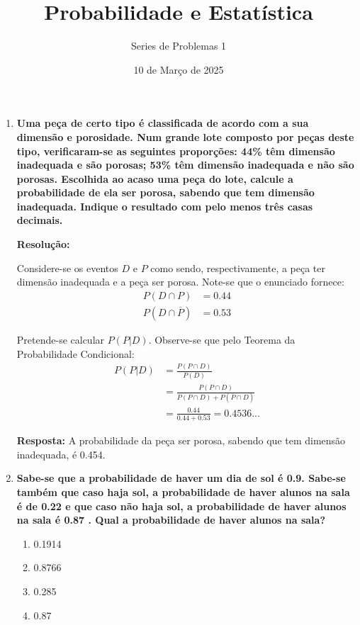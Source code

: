 \documentclass[a4paper,12pt]{article}
\author{Series de Problemas 1}
\begin{document}
\title{Probabilidade e Estatística}
\date{10 de Março de 2025}
\maketitle

\begin{enumerate}
  \item \textbf{Uma peça de certo tipo é classificada de acordo com a sua dimensão e porosidade. Num grande lote composto por peças deste tipo, verificaram-se as seguintes proporções: 44\% têm dimensão inadequada e são porosas; 53\% têm dimensão inadequada e não são porosas.
  Escolhida ao acaso uma peça do lote, calcule a probabilidade de ela ser porosa, sabendo que tem dimensão inadequada.
  Indique o resultado com pelo menos três casas decimais.}
  
  \vspace{0.3cm}
  
  \begin{mdframed}[backgroundcolor=gray!10, linewidth=0pt, innertopmargin=10pt, innerbottommargin=10pt]
  \textbf{Resolução:}
  
  Considere-se os eventos $D$ e $P$ como sendo, respectivamente, a peça ter dimensão inadequada e a peça ser porosa. Note-se que o enunciado fornece:
  \begin{align*}
    P(D \cap P) &= 0.44 \\
    P(D \cap \overline{P}) &= 0.53
  \end{align*}
  
  Pretende-se calcular $P(P|D)$. Observe-se que pelo Teorema da Probabilidade Condicional:
  \begin{align*}
     P(P|D) &= \frac{P(P \cap D)}{P(D)} \\
    &= \frac{P(P \cap D)}{P(P \cap D) + P(\overline{P} \cap D)} \\
    &= \displaystyle \frac{0.44}{0.44+0.53} = 0.4536...
  \end{align*}

  \textbf{Resposta:} A probabilidade da peça ser porosa, sabendo que tem dimensão inadequada, é 0.454.
  \end{mdframed}

  \vspace{0.5cm}
  
  \item \textbf{Sabe-se que a probabilidade de haver um dia de sol é 0.9. Sabe-se também que caso haja sol, a probabilidade de haver alunos na sala é de 0.22 e que caso não haja sol, a probabilidade de haver alunos na sala é 0.87 .
  Qual a probabilidade de haver alunos na sala?}
  \begin{enumerate}
    \item 0.1914
    \item 0.8766
    \item 0.285
    \item 0.87
  \end{enumerate}
  

\end{enumerate}
\end{document}
